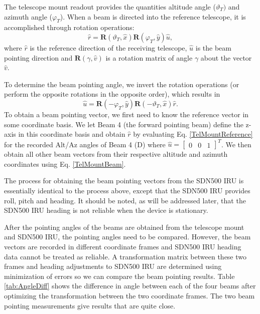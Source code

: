 \documentclass[12pt,twoside,english]{article}\usepackage[]{graphicx}\usepackage[]{color}
\begin{document}
The telescope mount readout provides the quantities altitude angle ($\vartheta_{T})$ and azimuth angle ($\varphi_{T}$). When a beam is directed into the reference telescope, it is accomplished through rotation operations:  
\begin{equation}
\hat{r}=\mathbf{R}(\vartheta_{T},\hat{x})\mathbf{R}(\varphi_{T},\hat{y})\hat{u},\label{TelMountReference}
\end{equation}
where $\hat{r}$ is the reference direction of the receiving telescope, $\hat{u}$ is the beam pointing direction and $\mathbf{R}(\gamma,\hat{v})$ is a rotation matrix of angle $\gamma$ about the vector $\hat{v}$. 

To determine the beam pointing angle, we invert the rotation operations (or perform the opposite rotations in the opposite order), which results in  
\begin{equation}
\hat{u}=\mathbf{R}(-\varphi_{T},\hat{y})\mathbf{R}(-\vartheta_{T},\hat{x})\hat{r}.\label{TelMountBeam}
\end{equation}
To obtain a beam pointing vector, we first need to know the reference vector in some coordinate basis. We let Beam 4 (the forward pointing beam) define the z-axis in this coordinate basis and obtain $\hat{r}$ by evaluating Eq. \eqref{TelMountReference} for the recorded Alt/Az angles of Beam 4 (D) where $\hat{u}=\left[\begin{array}{ccc} 0 & 0 & 1\end{array}\right]^{T}$. We then obtain all other beam vectors from their respective altitude and azimuth coordinates using Eq. \eqref{TelMountBeam}. 

The process for obtaining the beam pointing vectors from the SDN500 IRU is essentially identical to the process above, except that the SDN500 IRU provides roll, pitch and heading. It should be noted, as will be addressed later, that the SDN500 IRU heading is not reliable when the device is stationary. 

After the pointing angles of the beams are obtained from the telescope mount and SDN500 IRU, the pointing angles need to be compared. However, the beam vectors are recorded in different coordinate frames and SDN500 IRU heading data cannot be treated as reliable. A transformation matrix between these two frames and heading adjustments to SDN500 IRU are determined using minimization of errors so we can compare the beam pointing results. Table \ref{tab:AngleDiff} shows the difference in angle between each of the four beams after optimizing the transformation between the two coordinate frames. The two beam pointing measurements give results that are quite close. 
\end{document}
